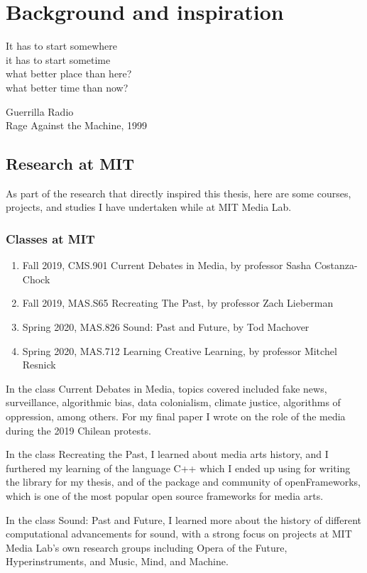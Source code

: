 \chapter{Background and inspiration}

\epigraph{It has to start somewhere \\ it has to start sometime \\ what better place than here? \\ what better time than now?}{Guerrilla Radio \\ Rage Against the Machine, 1999}

\section{Research at MIT}

As part of the research that directly inspired this thesis, here are some courses, projects, and studies I have undertaken while at MIT Media Lab.

\subsection{Classes at MIT}

\begin{enumerate}
  \item Fall 2019, CMS.901 Current Debates in Media, by professor Sasha Costanza-Chock
  \item Fall 2019, MAS.S65 Recreating The Past, by professor Zach Lieberman
  \item Spring 2020, MAS.826 Sound: Past and Future, by Tod Machover
  \item Spring 2020, MAS.712 Learning Creative Learning, by professor Mitchel Resnick
\end{enumerate}

In the class Current Debates in Media, topics covered included fake news, surveillance, algorithmic bias, data colonialism, climate justice, algorithms of oppression, among others. For my final paper I wrote on the role of the media during the 2019 Chilean protests.

In the class Recreating the Past, I learned about media arts history, and I furthered my learning of the language C++ which I ended up using for writing the library for my thesis, and of the package and community of openFrameworks, which is one of the most popular open source frameworks for media arts.

In the class Sound: Past and Future, I learned more about the history of different computational advancements for sound, with a strong focus on projects at MIT Media Lab's own research groups including Opera of the Future, Hyperinstruments, and Music, Mind, and Machine.

